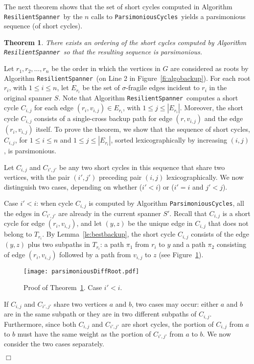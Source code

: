 \documentclass{article}
\newtheorem{theorem}{Theorem}
\newcommand{\qed}{\hfill \ensuremath{\Box}}
\newenvironment{proof}{\vspace{1ex}\noindent{\bf Proof.}\hspace{0.5em}}
	{\hfill\qed\vspace{2ex}}
\newcommand{\ResilientSpanner}{\texttt{ResilientSpanner}}
\newcommand{\ParsimoniousCycles}{\texttt{ParsimoniousCycles}}
\begin{document}
The next theorem shows that the set of short cycles computed in Algorithm \ResilientSpanner\ by the $n$ calls to 
\ParsimoniousCycles\ yields a parsimonious sequence (of short cycles).

\begin{theorem}\label{th:isparsimonious}
There exists an ordering of the short cycles computed by Algorithm \ResilientSpanner\ so that the resulting sequence is parsimonious.
\end{theorem}
\begin{proof}
Let $r_1, r_2, \ldots, r_n$ be the order in which the vertices in $G$ are considered as roots by Algorithm \ResilientSpanner\ (on Line 2 in Figure~\ref{fi:algobackup}). For each root $r_i$, with $1 \leq i \leq n$, 
let $E_{r_i}$ be the set of $\sigma$-fragile edges incident to $r_i$ in the original spanner $S$. Note that Algorithm
\ResilientSpanner\ computes
 a short cycle $C_{i,j}$  
 for each edge $(r_i,v_{i,j}) \in E_{r_i}$, with $1 \leq j \leq |E_{r_i}|$. Moreover, the short cycle 
 $C_{i,j}$
consists of a single-cross backup path for edge $(r,v_{i,j})$ and the edge $(r_i,v_{i,j})$ itself. To prove the theorem, we show that the sequence of short cycles, $C_{i,j}$, for $1 \leq i \leq n$ and $1 \leq j \leq |E_{r_i}|$, sorted lexicographically by increasing $(i,j)$, is parsimonious.

Let $C_{i,j}$ and $C_{i',j'}$ be any two short cycles in this sequence that share two vertices, with the pair $(i',j')$ preceding pair $(i,j)$ lexicographically. We now distinguish two cases, depending on whether  ($i' < i$) or ($i' = i$ and $j'<j$).

\begin{description}
\item{Case $i' < i$:} when cycle $C_{i,j}$ is computed by Algorithm \ParsimoniousCycles, all the edges in $C_{i',j'}$ are already in the current spanner $S'$.
Recall that $C_{i,j}$ is a short cycle for edge $(r_i,v_{i,j})$, and let $(y,z)$ be the unique edge in $C_{i,j}$ that does not belong to $T_{r_i}$. By Lemma~\ref{le:bestbackup},
the short cycle $C_{i,j}$ consists of the edge $(y,z)$ plus two subpaths in $T_{r_i}$: a path $\pi_1$ from $r_i$ to $y$ and a path $\pi_2$ consisting of  edge  $(r_i,v_{i,j})$ followed by a path from $v_{i,j}$ to $z$ (see Figure~\ref{fi:parsimoniousDiffRoot}).  
\begin{figure}[t]
\begin{center}
\texttt{[image: parsimoniousDiffRoot.pdf]}
\end{center}
\caption{Proof of Theorem~\ref{th:isparsimonious}. Case $i' < i$.}\protect\label{fi:parsimoniousDiffRoot}
\end{figure}
If $C_{i,j}$ and $C_{i',j'}$ share two vertices $a$ and $b$, two cases may occur: either $a$ and $b$ are in the same subpath
or they are in two different subpaths of $C_{i,j}$. Furthermore, 
since both $C_{i,j}$ and $C_{i',j'}$ are short cycles, the portion of $C_{i,j}$ from $a$ to $b$ must have the same weight as the portion of $C_{i',j'}$ from $a$ to $b$.
We now consider the two cases separately.




\end{description}
\end{proof}
\end{document}
